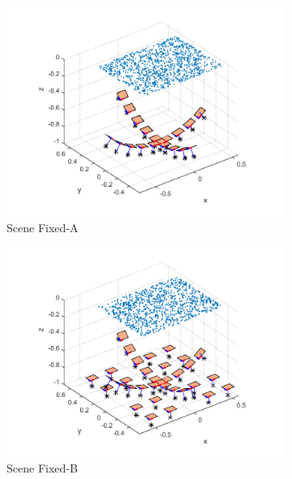 \documentclass[10pt,twocolumn,letterpaper]{article}
\begin{document}
\begin{figure}
\centering
\begin{subfigure}[b]{0.32\linewidth}
	\includegraphics[width=\linewidth]{images/synthCameraPosesRotation.pdf}
	\caption{Scene Fixed-A}
\end{subfigure}
\begin{subfigure}[b]{0.32\linewidth}
	\includegraphics[width=\linewidth]{images/synthCameraPosesTranslation.pdf}
	\caption{Scene Fixed-B}
\end{subfigure}
\begin{subfigure}[b]{0.32\linewidth}

\end{subfigure}
\end{figure}
\end{document}

